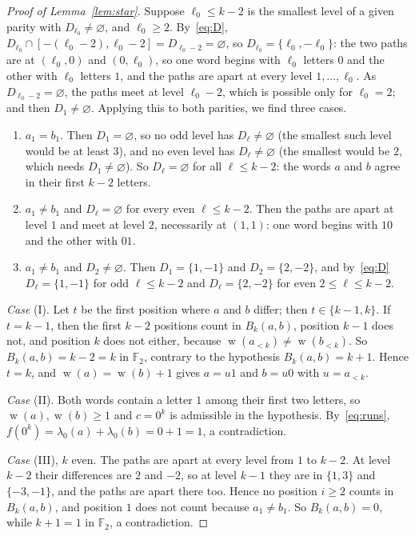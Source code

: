 \documentclass[11pt]{amsart}
\theoremstyle{definition}
\theoremstyle{remark}
\numberwithin{equation}{section}
\newcommand{\F}{\mathbb{F}}
\DeclareMathOperator{\wt}{w}
\begin{document}
\begin{proof}[Proof of Lemma~\ref{lem:star}]
Suppose $\ell_0\le k-2$ is the smallest level of a given parity with $D_{\ell_0}\ne\varnothing$, and $\ell_0\ge2$. By~\eqref{eq:D}, $D_{\ell_0}\cap[-(\ell_0-2),\ell_0-2]=D_{\ell_0-2}=\varnothing$, so $D_{\ell_0}=\{\ell_0,-\ell_0\}$: the two paths are at $(\ell_0,0)$ and $(0,\ell_0)$, so one word begins with $\ell_0$ letters $0$ and the other with $\ell_0$ letters $1$, and the paths are apart at every level $1,\dots,\ell_0$. As $D_{\ell_0-2}=\varnothing$, the paths meet at level $\ell_0-2$, which is possible only for $\ell_0=2$; and then $D_1\ne\varnothing$. Applying this to both parities, we find three cases.
\begin{enumerate}[label=(\Roman*)]
\item $a_1=b_1$. Then $D_1=\varnothing$, so no odd level has $D_\ell\ne\varnothing$ (the smallest such level would be at least $3$), and no even level has $D_\ell\ne\varnothing$ (the smallest would be $2$, which needs $D_1\ne\varnothing$). So $D_\ell=\varnothing$ for all $\ell\le k-2$: the words $a$ and $b$ agree in their first $k-2$ letters.
\item $a_1\ne b_1$ and $D_\ell=\varnothing$ for every even $\ell\le k-2$. Then the paths are apart at level $1$ and meet at level $2$, necessarily at $(1,1)$: one word begins with $10$ and the other with $01$.
\item $a_1\ne b_1$ and $D_2\ne\varnothing$. Then $D_1=\{1,-1\}$ and $D_2=\{2,-2\}$, and by~\eqref{eq:D} $D_\ell=\{1,-1\}$ for odd $\ell\le k-2$ and $D_\ell=\{2,-2\}$ for even $2\le\ell\le k-2$.
\end{enumerate}

\emph{Case} (I). Let $t$ be the first position where $a$ and $b$ differ; then $t\in\{k-1,k\}$. If $t=k-1$, then the first $k-2$ positions count in $B_k(a,b)$, position $k-1$ does not, and position $k$ does not either, because $\wt(a_{<k})\ne\wt(b_{<k})$. So $B_k(a,b)=k-2=k$ in $\F_2$, contrary to the hypothesis $B_k(a,b)=k+1$. Hence $t=k$, and $\wt(a)=\wt(b)+1$ gives $a=u1$ and $b=u0$ with $u=a_{<k}$.

\emph{Case} (II). Both words contain a letter $1$ among their first two letters, so $\wt(a),\wt(b)\ge1$ and $c=0^k$ is admissible in the hypothesis. By~\eqref{eq:runs}, $f(0^k)=\lambda_0(a)+\lambda_0(b)=0+1=1$, a contradiction.

\emph{Case} (III), $k$ even. The paths are apart at every level from $1$ to $k-2$. At level $k-2$ their differences are $2$ and $-2$, so at level $k-1$ they are in $\{1,3\}$ and $\{-3,-1\}$, and the paths are apart there too. Hence no position $i\ge2$ counts in $B_k(a,b)$, and position $1$ does not count because $a_1\ne b_1$. So $B_k(a,b)=0$, while $k+1=1$ in $\F_2$, a contradiction.


\end{proof}
\end{document}
